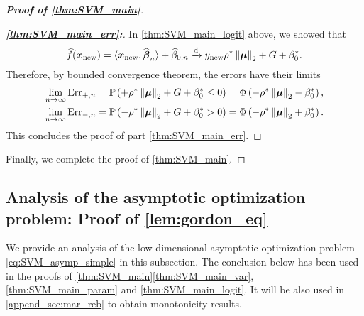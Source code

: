 \begin{proof}[\textbf{Proof of \cref{thm:SVM_main}}]
\begin{proof}[\textbf{\emph{\ref{thm:SVM_main_err}:}}]
In \ref{thm:SVM_main_logit} above, we showed that
\begin{equation*}
        \widehat f(\text{\boldmath $x$}_\mathrm{new}) = \langle \text{\boldmath $x$}_\mathrm{new}, \widehat{{\boldsymbol{\beta}}}_n \rangle + \widehat\beta_{0,n}
        \xrightarrow{\mathrm{d}} y_\mathrm{new} \rho^* \left\|{\text{\boldmath $\mu$}}\right\|_2 + G + \beta_{0}^*.
\end{equation*}
Therefore, by bounded convergence theorem, the errors have their limits
\begin{align*}
        \lim_{n \to \infty} \mathrm{Err}_{+,n} & = \mathbb{P}\left( + \rho^* \left\|{\text{\boldmath $\mu$}}\right\|_2 + G + \beta_{0}^* \le 0 \right)
        = \Phi \left(- \rho^* \left\|{\text{\boldmath $\mu$}}\right\|_2  - \beta_0^* \right), \\
        \lim_{n \to \infty} \mathrm{Err}_{-,n} & = \mathbb{P}\left( - \rho^* \left\|{\text{\boldmath $\mu$}}\right\|_2 + G + \beta_{0}^* >  0 \right)
        = \Phi \left(- \rho^* \left\|{\text{\boldmath $\mu$}}\right\|_2  + \beta_0^* \right).
\end{align*}
This concludes the proof of part \ref{thm:SVM_main_err}.
\end{proof}
Finally, we complete the proof of \cref{thm:SVM_main}.
\end{proof}






\subsection{Analysis of the asymptotic optimization problem: Proof of \cref{lem:gordon_eq}}
\label{subsec:over_asymp}

We provide an analysis of the low dimensional asymptotic optimization problem \cref{eq:SVM_asymp_simple} in this subsection. The conclusion below has been used in the proofs of \cref{thm:SVM_main}\ref{thm:SVM_main_var}, \ref{thm:SVM_main_param} and \ref{thm:SVM_main_logit}. It will be also used in \cref{append_sec:mar_reb} to obtain monotonicity results.

